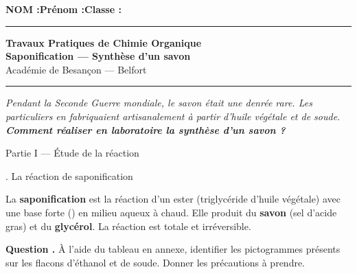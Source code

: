 \documentclass[11pt,a4paper]{article}
\newcommand{\sectitle}[1]{%
  \vspace{6pt}
  \noindent\colorbox{exoheader}{\parbox{\dimexpr\linewidth-2\fboxsep}%
    {\color{white}\bfseries\large\strut\quad #1}}
  \vspace{4pt}
}
\newcommand{\subsectitle}[1]{%
  \vspace{4pt}
  \noindent\colorbox{exolight}{\parbox{\dimexpr\linewidth-2\fboxsep}%
    {\color{exoheader}\bfseries\strut\quad #1}}
  \vspace{2pt}
}
\newcounter{question}
\newcommand{\question}{%
  \stepcounter{question}%
  \noindent\textcolor{exoheader}{\textbf{Question \thequestion.}}\quad
}
\begin{document}
\noindent\textbf{NOM :}\hfill\textbf{Prénom :}\hfill\textbf{Classe :}\hfill\phantom{x}\\[0.2cm]
\hrule\vspace{0.2cm}

\begin{center}
  {\large\bfseries\textcolor{exoheader}{Travaux Pratiques de Chimie Organique}}\\[4pt]
  {\LARGE\bfseries Saponification --- Synthèse d'un savon}\\[2pt]
  {\small Académie de Besançon --- Belfort}
\end{center}
\hrule\vspace{6pt}

\begin{tcolorbox}[enhanced, colback=problemebg, colframe=exoheader, boxrule=1.5pt,
  title={\faFlask\quad Problématique},
  fonttitle=\bfseries\color{white},
  attach boxed title to top left={yshift=-2mm, xshift=4mm},
  boxed title style={colback=exoheader, colframe=exoheader}]
\textit{Pendant la Seconde Guerre mondiale, le savon était une denrée rare.
Les particuliers en fabriquaient artisanalement à partir d'huile végétale et de soude.
\textbf{Comment réaliser en laboratoire la synthèse d'un savon ?}}
\end{tcolorbox}

\vspace{6pt}

\sectitle{Partie I --- Étude de la réaction}

\subsectitle{1. La réaction de saponification}

\begin{mdframed}[backgroundcolor=exolight, linecolor=exoheader, linewidth=1.2pt]
La \textbf{saponification} est la réaction d'un ester (triglycéride d'huile végétale)
avec une base forte () en milieu aqueux à chaud.
Elle produit du \textbf{savon} (sel d'acide gras) et du \textbf{glycérol}.
La réaction est totale et irréversible.
\end{mdframed}

\vspace{4pt}
\question À l'aide du tableau en annexe, identifier les pictogrammes présents sur les flacons
d'éthanol et de soude. Donner les précautions à prendre. \dotfill

\vspace{0.3cm}\noindent\dotfill
\end{document}
